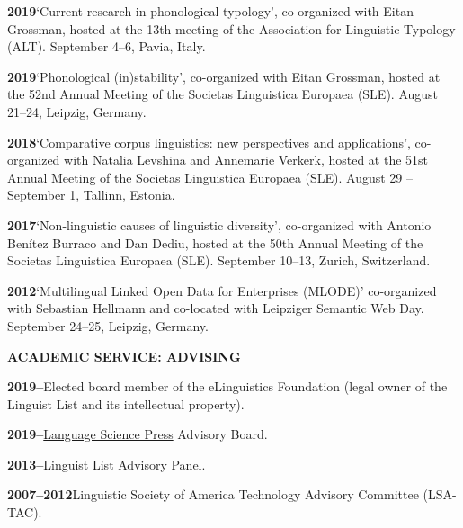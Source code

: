 \documentclass[11pt]{article}
\newcommand{\hangpara}{
 \setlength{\parindent}{0in} %
 \hangindent=0.42in %
}
\begin{document}
\hangpara
{\bf 2019}\hspace{1ex}`Current research in phonological typology', co-organized with Eitan Grossman, hosted at the 13th meeting of the Association for Linguistic Typology (ALT). September 4--6, Pavia, Italy.

\hangpara
\vskip 6pt
{\bf 2019}\hspace{1ex}`Phonological (in)stability', co-organized with Eitan Grossman, hosted at the 52nd Annual Meeting of the Societas Linguistica Europaea (SLE). August 21--24, Leipzig, Germany.

\hangpara
\vskip 6pt
{\bf 2018}\hspace{1ex}`Comparative corpus linguistics: new perspectives and applications', co-organized with Natalia Levshina and Annemarie Verkerk, hosted at the 51st Annual Meeting of the Societas Linguistica Europaea (SLE). August 29 -- September 1, Tallinn, Estonia.

\hangpara
\vskip 6pt
{\bf 2017}\hspace{1ex}`Non-linguistic causes of linguistic diversity', co-organized with Antonio Benítez Burraco and Dan Dediu, hosted at the 50th Annual Meeting of the Societas Linguistica Europaea (SLE). September 10--13, Zurich, Switzerland.

\vskip 6pt
\hangpara
{\bf 2012}\hspace{1ex}`Multilingual Linked Open Data for Enterprises (MLODE)' co-organized with Sebastian Hellmann and co-located with Leipziger Semantic Web Day. September 24--25, Leipzig, Germany.


\vskip 20pt
\begin{flushleft}
{\bf ACADEMIC SERVICE: ADVISING}
\end{flushleft}

\hangpara
{\bf 2019--}\hspace{1ex}Elected board member of the eLinguistics Foundation (legal owner of the Linguist List and its intellectual property).

\vskip 6pt
\hangpara
{\bf 2019--}\hspace{1ex}\href{https://langsci-press.org/}{Language Science Press} Advisory Board.

\vskip 6pt
\hangpara
{\bf 2013--}\hspace{1ex}Linguist List Advisory Panel.

\vskip 6pt
\hangpara
{\bf 2007--2012}\hspace{1ex}Linguistic Society of America Technology Advisory Committee (LSA-TAC).
\end{document}
